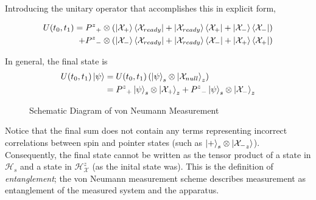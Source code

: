 Introducing the unitary operator that accomplishes this in explicit form,

\begin{align}
  U(t_0, t_1) = {P^z}_+ \otimes \left(\ket{\mathcal{X}_{+}}\bra{\mathcal{X}_{ready}} + \ket{\mathcal{X}_{ready}}\bra{\mathcal{X}_{+}} + \ket{\mathcal{X}_{-}}\bra{\mathcal{X}_{-}} \right) \\ \nonumber
  + {P^z}_- \otimes \left(\ket{\mathcal{X}_{-}}\bra{\mathcal{X}_{ready}} + \ket{\mathcal{X}_{ready}}\bra{\mathcal{X}_{-}} + \ket{\mathcal{X}_{+}}\bra{\mathcal{X}_{+}} \right)
\end{align}

In general, the final state is
\begin{align}
  U(t_0, t_1)\ket{\psi} & =  U(t_0, t_1) \left(\ket{\psi}_s \otimes \ket{\mathcal{X}_{null}}_z\right) \\
  &= {P^z}_+ \ket{\psi}_s \otimes \ket{\mathcal{X}_{+}}_z + {P^z}_- \ket{\psi}_s \otimes \ket{\mathcal{X}_{-}}_z
\end{align}

\begin{figure}
\centering\CaptionFontSize
{}
\caption[Insert an abbreviated caption here to show in the List of Figures]
{Schematic Diagram of von Neumann Measurement}
\label{Figure:Measurement:DetectorStates}
\end{figure}

Notice that the final sum does not contain any terms representing incorrect correlations between spin and pointer states (such as $\ket{+}_s \otimes \ket{\mathcal{X_-}_z}$).  Consequently, the final state cannot be written as the tensor product of a state in $\mathcal{H}_s$ and a state in $\mathcal{H}^z_\mathcal{X}$ (as the inital state was). This is the definition of \textit{entanglement}; the von Neumann measurement scheme describes measurement as entanglement of the measured system and the apparatus.

